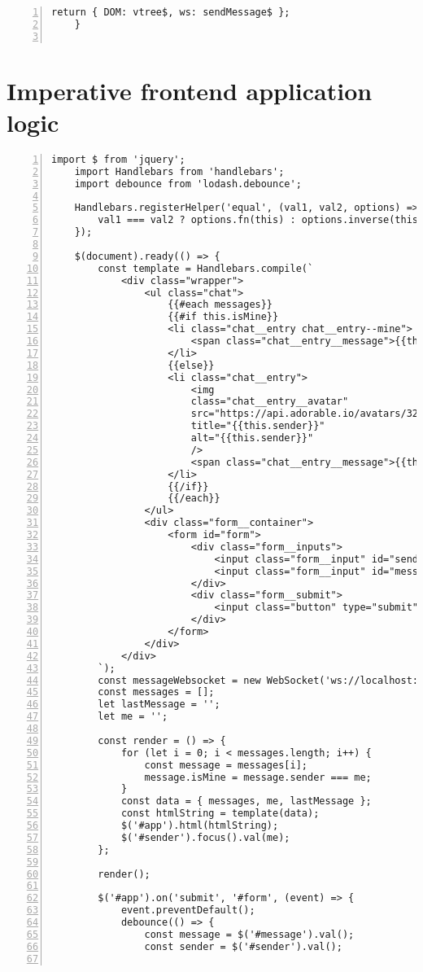 \begin{appendices}
\begin{lstlisting}[numbers=left]
		return { DOM: vtree$, ws: sendMessage$ };
	}
	
	\end{lstlisting}
	
	\chapter{Imperative frontend application logic}
	\label{appendix:imp}
	
	\begin{lstlisting}[numbers=left]
	import $ from 'jquery';
	import Handlebars from 'handlebars';
	import debounce from 'lodash.debounce';
	
	Handlebars.registerHelper('equal', (val1, val2, options) => {
		val1 === val2 ? options.fn(this) : options.inverse(this);
	});
	
	$(document).ready(() => {
		const template = Handlebars.compile(`
			<div class="wrapper">
				<ul class="chat">
					{{#each messages}}
					{{#if this.isMine}}
					<li class="chat__entry chat__entry--mine">
						<span class="chat__entry__message">{{this.message}}</span>
					</li>
					{{else}}
					<li class="chat__entry">
						<img
						class="chat__entry__avatar"
						src="https://api.adorable.io/avatars/32/{{this.sender}}.svg"
						title="{{this.sender}}"
						alt="{{this.sender}}"
						/>
						<span class="chat__entry__message">{{this.message}}</span>
					</li>
					{{/if}}
					{{/each}}
				</ul>
				<div class="form__container">
					<form id="form">
						<div class="form__inputs">
							<input class="form__input" id="sender" type="text" placeholder="Your name" />
							<input class="form__input" id="message" type="text" value="{{lastMessage}}" placeholder="Type a message..." />
						</div>
						<div class="form__submit">
							<input class="button" type="submit" id="button__send" value="Send" />
						</div>
					</form>
				</div>
			</div>
		`);
		const messageWebsocket = new WebSocket('ws://localhost:8001');
		const messages = [];
		let lastMessage = '';
		let me = '';
		
		const render = () => {
			for (let i = 0; i < messages.length; i++) {
				const message = messages[i];
				message.isMine = message.sender === me;
			}
			const data = { messages, me, lastMessage };
			const htmlString = template(data);
			$('#app').html(htmlString);
			$('#sender').focus().val(me);
		};
		
		render();
		
		$('#app').on('submit', '#form', (event) => {
			event.preventDefault();
			debounce(() => {
				const message = $('#message').val();
				const sender = $('#sender').val();
				

\end{lstlisting}
\end{appendices}
